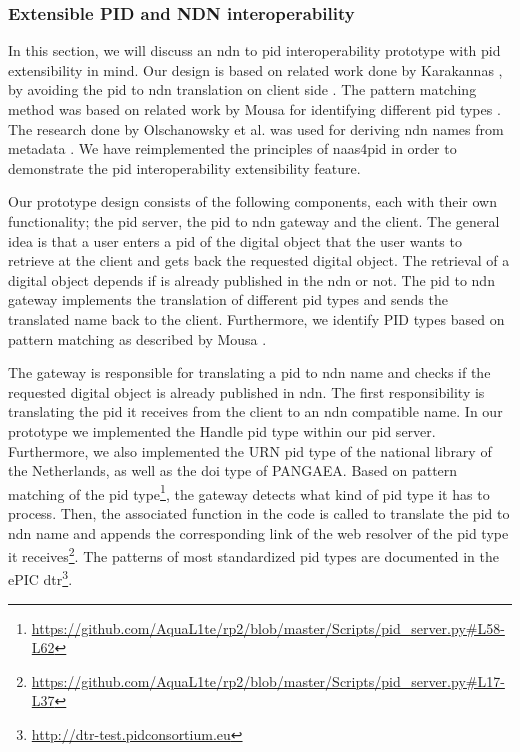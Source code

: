 \documentclass[conference]{IEEEtran}
\begin{document}
\subsubsection{Extensible PID and NDN interoperability}
\label{interoperablity}
In this section, we will discuss an \gls{ndn} to \gls{pid} interoperability prototype with \gls{pid} extensibility in mind. Our design is based on related work done by Karakannas \cite{icn-bd}, by avoiding the \gls{pid} to \gls{ndn} translation on client side \cite{icn-bd}. The pattern matching method was based on related work by Mousa for identifying different \gls{pid} types \cite{ndn-app-aware}. The research done by Olschanowsky et al. was used for deriving \gls{ndn} names from metadata \cite{ndn-man}. We have reimplemented the principles of \gls{naas4pid} in order to demonstrate the \gls{pid} interoperability extensibility feature.

Our prototype design consists of the following components, each with their own functionality; the \gls{pid} server, the \gls{pid} to \gls{ndn} gateway and the client. The general idea is that a user enters a \gls{pid} of the digital object that the user wants to retrieve at the client and gets back the requested digital object. The retrieval of a digital object depends if is already published in the \gls{ndn} or not. The \gls{pid} to \gls{ndn} gateway implements the translation of different \gls{pid} types and sends the translated name back to the client. Furthermore, we identify PID types based on pattern matching as described by Mousa \cite{ndn-app-aware}.

The gateway is responsible for translating a \gls{pid} to \gls{ndn} name and checks if the requested digital object is already published in \gls{ndn}. The first responsibility is translating the \gls{pid} it receives from the client to an \gls{ndn} compatible name. In our prototype we implemented the Handle \gls{pid} type within our \gls{pid} server. Furthermore, we also implemented the URN \gls{pid} type of the national library of the Netherlands, as well as the \gls{doi} type of PANGAEA. Based on pattern matching of the \gls{pid} type\footnote{\url{https://github.com/AquaL1te/rp2/blob/master/Scripts/pid_server.py#L58-L62}}, the gateway detects what kind of \gls{pid} type it has to process. Then, the associated function in the code is called to translate the \gls{pid} to \gls{ndn} name and appends the corresponding link of the web resolver of the \gls{pid} type it receives\footnote{\url{https://github.com/AquaL1te/rp2/blob/master/Scripts/pid_server.py#L17-L37}}. The patterns of most standardized \gls{pid} types are documented in the ePIC \gls{dtr}\footnote{\url{http://dtr-test.pidconsortium.eu}}.
\end{document}
